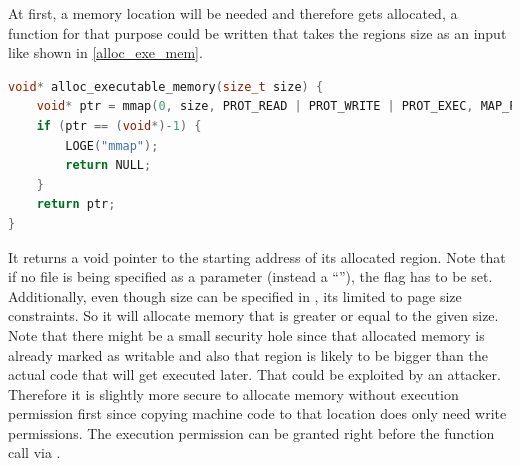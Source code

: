 At first, a memory location will be needed and therefore gets allocated,
a function for that purpose could be written that takes the regions size as an input like shown in \autoref{alloc_exe_mem}.
\begin{lstlisting}[language=C++, caption=alloc\_executable\_memory(), label=alloc_exe_mem]
void* alloc_executable_memory(size_t size) {
    void* ptr = mmap(0, size, PROT_READ | PROT_WRITE | PROT_EXEC, MAP_PRIVATE | MAP_ANONYMOUS, -1, 0);
    if (ptr == (void*)-1) {
        LOGE("mmap");
        return NULL;
    }
    return ptr;
}
\end{lstlisting}
It returns a void pointer to the starting address of its allocated region. Note that
if no file is being specified as a  parameter (instead a ``''),
the  flag has to be set. Additionally, even though size can be specified in , its limited to page size constraints. So it will allocate
memory that is greater or equal to the given size. Note that there might be a
small security hole since that allocated memory is already marked as writable
and also that region is likely to be bigger than the actual code that will get
executed later. That could be exploited by an attacker. Therefore it is slightly more secure to allocate memory without execution  permission first since copying machine code to that location does only need write
permissions. The execution permission can be granted right before the function call
via .

